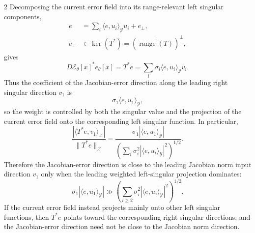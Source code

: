 \begin{multicols}{2}
Decomposing the current error field into its range-relevant left singular
components,
\begin{equation}
  \begin{aligned}
    e
    &=
    \sum_i
    \langle e,u_i\rangle_{\mathcal{Y}} u_i
    +
    e_\perp,\\
    e_\perp
    &\in
    \ker(T^*)=(\overline{\operatorname{range}(T)})^\perp,
  \end{aligned}
\end{equation}
gives
\begin{equation}
  D\mathcal{E}_\theta[x]^*e_\theta[x]
  =
  T^*e
  =
  \sum_i
  \sigma_i
  \langle e,u_i\rangle_{\mathcal{Y}} v_i .
\end{equation}
Thus the coefficient of the Jacobian-error direction along the leading
right singular direction $v_1$ is
\begin{equation}
  \sigma_1
  \langle e,u_1\rangle_{\mathcal{Y}},
\end{equation}
so the weight is controlled by both the singular value and the projection of
the current error field onto the corresponding left singular function. In
particular,
\begin{equation}
  \frac{
    |\langle T^*e,v_1\rangle_{\mathcal{X}}|
  }{
    \|T^*e\|_{\mathcal{X}}
  }
  =
  \frac{
    \sigma_1|\langle e,u_1\rangle_{\mathcal{Y}}|
  }{
    \left(
      \sum_i
      \sigma_i^2
      |\langle e,u_i\rangle_{\mathcal{Y}}|^2
    \right)^{1/2}
  } .
\end{equation}
Therefore the Jacobian-error direction is close to the leading Jacobian norm
input direction $v_1$ only when the leading weighted left-singular projection
dominates:
\begin{equation}
  \sigma_1|\langle e,u_1\rangle_{\mathcal{Y}}|
  \gg
  \left(
    \sum_{i\ge2}
    \sigma_i^2
    |\langle e,u_i\rangle_{\mathcal{Y}}|^2
  \right)^{1/2}.
\end{equation}
If the current error field instead projects mainly onto other left singular
functions, then $T^*e$ points toward the corresponding right singular
directions, and the Jacobian-error direction need not be close to the
Jacobian norm direction.
\end{multicols}

\clearpage
{}


